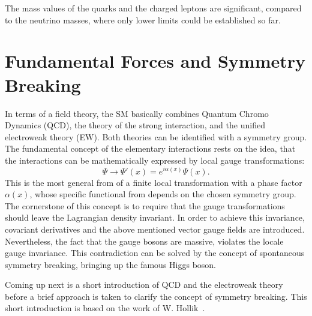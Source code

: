  The  mass values of the quarks and the charged leptons are significant, compared to the neutrino masses, where only lower limits could be established so far.
 
\vspace{0.1cm}




 


 
\section{Fundamental Forces and Symmetry Breaking}
In terms of a field theory, the SM basically combines Quantum Chromo Dynamics (QCD), the theory of the strong interaction, and the unified electroweak theory (EW). Both theories can be identified with a symmetry group.
The fundamental concept of the  elementary interactions rests on the idea, that the interactions can be mathematically expressed by  local gauge transformations:
\begin{equation}\label{trafo}
\Psi \longrightarrow \Psi'(x) =  e^{i\alpha(x)}\Psi(x).
\end{equation}  
This is the most general from of a finite local transformation with a phase factor $\alpha(x)$, whose specific functional from depends  on the chosen symmetry group. 
The cornerstone of this concept is to require that the gauge transformations should leave the Lagrangian density invariant.  
In order to achieve this invariance, covariant derivatives  and the above mentioned vector gauge fields are introduced. Nevertheless, the fact that the gauge bosons are massive, violates the locale gauge invariance. This contradiction can be solved by the concept of spontaneous symmetry breaking, bringing up the famous Higgs boson.

 Coming up next is a short introduction of QCD and the electroweak theory before a brief approach is taken to clarify the concept of symmetry breaking. This short introduction is based on the work of W. Hollik~\cite{Hollik:2010id}. 

